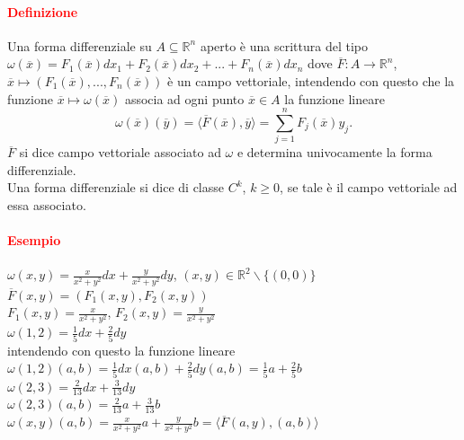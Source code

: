 \documentclass{article}
\newcommand{\R}{\mathbb{R}}
\begin{document}
\paragraph{\textcolor{red}{Definizione}}
Una forma differenziale su $A \subseteq \R^n$ aperto è una scrittura del tipo 
$\omega (\overline{x})=F_1(\overline{x})dx_1 +F_2(\overline{x})dx_2 +...+ F_n(\overline{x})dx_n$ dove $\overline{F}: A \rightarrow \R^n$, $\overline{x} \mapsto (F_1(\overline{x}),...,F_n(\overline{x}))$ è un campo vettoriale, intendendo con questo che la funzione $\overline{x}\mapsto \omega (\overline{x})$ associa ad ogni punto $\overline{x} \in A$ la funzione lineare
\begin{equation*}
    \omega(\overline{x})(\overline{y}) =\langle \overline{F}(\overline{x}),\overline{y}\rangle =\sum_{j=1}^n F_j (\overline{x}) y_j.
\end{equation*}
$\overline{F}$ si dice campo vettoriale associato ad $\omega$ e determina univocamente la forma differenziale.\\
Una forma differenziale si dice di classe $C^k$, $k \geq 0$, se tale è il campo vettoriale ad essa associato.

\paragraph{\textcolor{red}{Esempio}}
$\omega(x,y) =\frac{x}{x^2+y^2}dx+\frac{y}{x^2+y^2}dy$, $(x,y)\in \R^2\backslash \{(0,0)\}$\\
$\overline{F}(x,y)=(F_1(x,y),F_2(x,y))$\\
$F_1(x,y)=\frac{x}{x^2+y^2}$, $F_2(x,y)=\frac{y}{x^2+y^2}$\\
$\omega(1,2)=\frac{1}{5}dx+\frac{2}{5}dy$\\
 intendendo con questo la funzione lineare
$ \omega (1,2)(a,b)=\frac{1}{5}dx (a,b) + \frac{2}{5}dy (a,b) =\frac{1}{5}a + \frac{2}{5} b$\\
$\omega(2,3)=\frac{2}{13}dx+\frac{3}{13}dy$\\
$\omega(2,3)(a,b)=\frac{2}{13}a+\frac{3}{13}b$\\
$\omega(x,y)(a,b)=\frac{x}{x^2+y^2}a+ \frac{y}{x^2+y^2}b= \langle \overline{F}(a,y),(a,b) \rangle$
\end{document}
